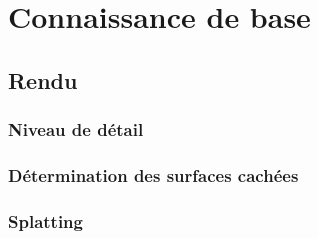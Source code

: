 \chapter{Connaissance de base \label{chap:background}}






\section{Rendu}
\subsection{Niveau de détail}
\subsection{Détermination des surfaces cachées}
\subsection{Splatting}
